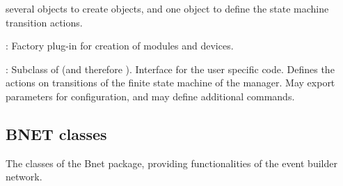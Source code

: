 \begin{description}
\begin{compactenum}
      several  objects to create objects, and 
      one  object to define the state machine transition actions.
\end{compactenum}
\item[\class{dabc::Factory}] : Factory plug-in for creation of modules and devices.
\item[\class{dabc::Application}] : Subclass of  
   (and therefore ). Interface for the user specific code. 
   Defines the actions on transitions of the finite state machine of the manager. 
   May export parameters for configuration, and may define additional commands.
\end{description}

\subsection{BNET classes}
\label{prog_bnet_classes}
The classes of the Bnet package, providing functionalities of the event builder network.

